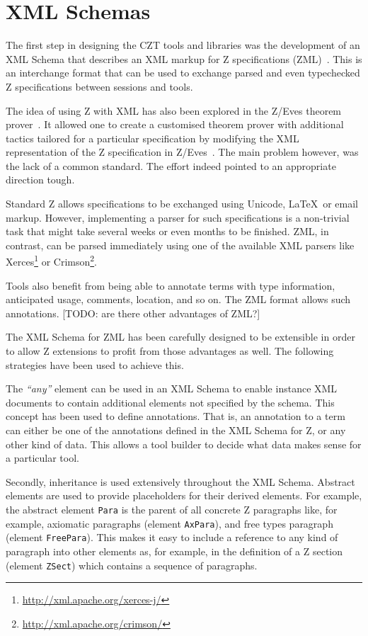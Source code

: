 \documentclass{llncs}
\newcommand{\Element}[1]{\texttt{#1}}
\begin{document}
\section{XML Schemas}
\label{xml-schemas}

  The first step in designing the CZT tools and libraries was the
  development of an XML Schema that describes an XML markup for Z
  specifications (ZML)~\cite{UttEA:03}.  This is an interchange format
  that can be used to exchange parsed and even typechecked Z
  specifications between sessions and tools.

  The idea of using Z with XML has also been explored in the
  Z/Eves theorem prover~\cite{tp.tools:zeves.ref}. It allowed one to
  create a customised theorem prover with additional tactics tailored
  for a particular specification by modifying the XML representation
  of the Z specification in Z/Eves~\cite{tp.tools:zeves.api}.
  The main problem however, was the lack of a common standard.
  The effort indeed pointed to an appropriate direction tough.

  Standard Z allows specifications to be exchanged using Unicode,
  \LaTeX\ or email markup.  However, implementing a parser for such
  specifications is a non-trivial task that might take several weeks
  or even months to be finished.  ZML, in contrast, can be parsed
  immediately using one of the available XML parsers like
  Xerces\footnote{\url{http://xml.apache.org/xerces-j/}} or
  Crimson\footnote{\url{http://xml.apache.org/crimson/}}.

  Tools also benefit from being able to annotate terms with type
  information, anticipated usage, comments, location, and so on.
  The ZML format allows such annotations. [TODO: are there other advantages of ZML?]

  The XML Schema for ZML has been carefully designed to be extensible
  in order to allow Z extensions to profit from those advantages as well.
  The following strategies have been used to achieve this.

  The \textit{``any''} element can be used in an XML Schema to enable
  instance XML documents to contain additional elements not specified
  by the schema.  This concept has been used to define annotations.
  That is, an annotation to a term can either be one of the
  annotations defined in the XML Schema for Z, or any other kind of
  data.  This allows a tool builder to decide what data makes sense
  for a particular tool.

  Secondly, inheritance is used extensively throughout the XML Schema.
  Abstract elements are used to provide placeholders for their derived
  elements.  For example, the abstract element \Element{Para} is the
  parent of all concrete Z paragraphs like, for example, axiomatic
  paragraphs (element \Element{AxPara}), and free types paragraph
  (element \Element{FreePara}).  This makes it easy to include a
  reference to any kind of paragraph into other elements as, for
  example, in the definition of a Z section (element \Element{ZSect})
  which contains a sequence of paragraphs.
\end{document}
